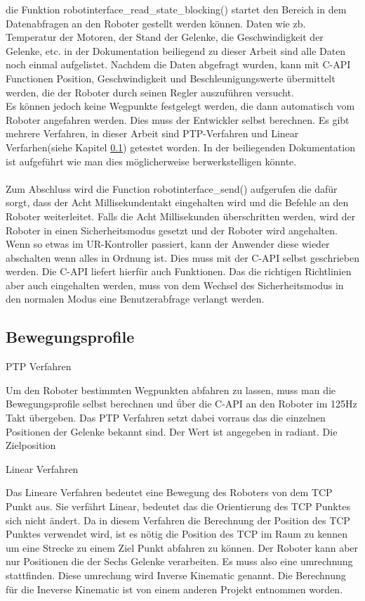 die Funktion robotinterface\_read\_state\_blocking() startet den Bereich in dem Datenabfragen an den Roboter gestellt werden können. Daten wie zb. Temperatur der Motoren, der Stand der Gelenke, die Geschwindigkeit der Gelenke, etc. in der Dokumentation beiliegend zu dieser Arbeit sind alle Daten noch einmal aufgelistet. Nachdem die Daten abgefragt wurden, kann mit C-\ac{API} Functionen Position, Geschwindigkeit und Beschleunigungswerte übermittelt werden, die der Roboter durch seinen Regler auszuführen versucht.\\
Es können jedoch keine Wegpunkte festgelegt werden, die dann automatisch vom Roboter angefahren werden. Dies muss der Entwickler selbst 
berechnen. Es gibt mehrere Verfahren, in dieser Arbeit sind \ac{PTP}-Verfahren und Linear Verfarhen(siehe Kapitel \ref{bewegungsprofile_gru}) getestet worden. In der beiliegenden Dokumentation ist aufgeführt wie man dies möglicherweise berwerkstelligen könnte.
\\\\
Zum Abschluss wird die Function robotinterface\_send() aufgerufen die dafür sorgt, dass der Acht Millisekundentakt eingehalten wird und die Befehle an den Roboter weiterleitet. Falls die Acht Millisekunden überschritten werden, wird der Roboter in einen Sicherheitsmodus gesetzt
und der Roboter wird angehalten.\\
Wenn so etwas im UR-Kontroller passiert, kann der Anwender diese wieder abschalten wenn alles in Ordnung ist. Dies muss mit der C-\ac{API} selbst geschrieben werden. Die C-\ac{API} liefert hierfür auch Funktionen. Das die richtigen Richtlinien aber auch eingehalten werden, muss von dem Wechsel des Sicherheitsmodus in den normalen Modus eine Benutzerabfrage verlangt werden.

\subsection{Bewegungsprofile}
\label{bewegungsprofile_gru}

\ac{PTP} Verfahren 

Um den Roboter bestimmten Wegpunkten abfahren zu lassen, muss man die Bewegungsprofile selbst berechnen und ǘber die C-API an den Roboter im 125Hz Takt übergeben. Das PTP Verfahren setzt dabei vorraus das die einzelnen Positionen der Gelenke bekannt sind. Der Wert ist angegeben in radiant. Die Zielposition

Linear Verfahren

Das Lineare Verfahren bedeutet eine Bewegung des Roboters von dem TCP Punkt aus. Sie verfährt Linear, bedeutet das die Orientierung 
des TCP Punktes sich nicht ändert. Da in diesem Verfahren die Berechnung der Position des TCP Punktes verwendet wird, ist es nötig die Position des TCP im Raum zu kennen um eine Strecke zu einem Ziel Punkt abfahren zu können. Der Roboter kann aber nur Positionen die der Sechs Gelenke verarbeiten. Es muss also eine umrechnung stattfinden. Diese umrechung wird Inverse Kinematic genannt. Die Berechnung für die Ineverse Kinematic ist von einem anderen Projekt entnommen worden.